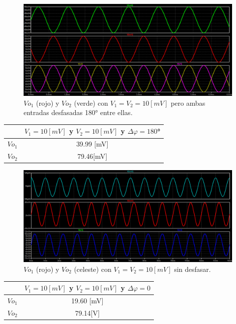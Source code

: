 \begin{figure}[H]
	\centering
	\includegraphics[width=1\textwidth]{figuras/Sim_Modo_Diferencial.png}
	\caption{$Vo_1$ (rojo) y $Vo_2$ (verde) con $V_1 = V_2 = 10[mV]$ pero ambas entradas desfasadas 180° entre ellas.}
\end{figure}
\begin{center}
	\begin{tabular}{| c | c |}
		\hline
		& $V_1=10[mV]$ y $V_2=10[mV]$ y $\Delta\varphi= 180$°\\ \hline
		$Vo_1$ 	&  	39.99 [mV]	 \\
		$Vo_2$ 	& 	79.46[mV]	 \\ \hline
	\end{tabular}
\end{center}
\begin{figure}[H]
	\centering
	\includegraphics[width=1\textwidth]{figuras/Sim_Modo_Comun.png}
	\caption{$Vo_1$ (rojo) y $Vo_2$ (celeste) con $V_1=V_2=10[mV]$ sin desfasar.}
\end{figure}
\begin{center}
	\begin{tabular}{| c | c |}
		\hline
		& $V_1=10[mV]$ y $V_2=10[mV]$ y $\Delta\varphi= 0$\\ \hline
		$Vo_1$ 	&  	19.60 [mV]	 \\
		$Vo_2$ 	& 	79.14[\textmu V]	 \\ \hline
	\end{tabular}
\end{center}
